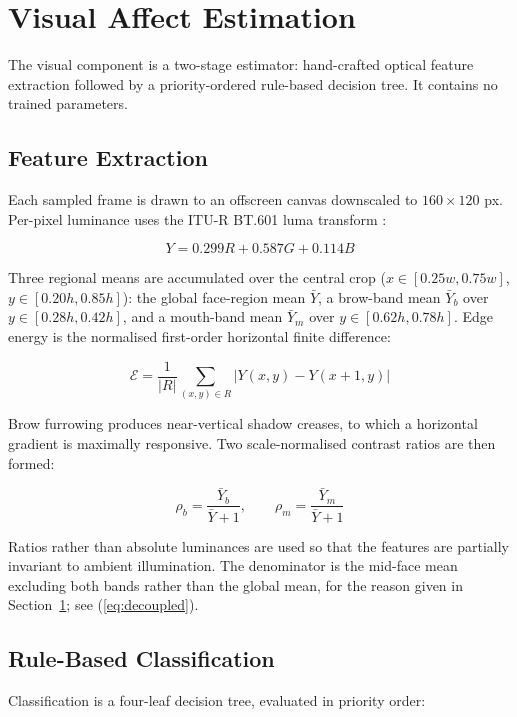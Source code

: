 \documentclass[conference]{IEEEtran}
\begin{document}
\section{Visual Affect Estimation}
\label{sec:vision}

The visual component is a two-stage estimator: hand-crafted optical feature
extraction followed by a priority-ordered rule-based decision tree. It contains
no trained parameters.

\subsection{Feature Extraction}
Each sampled frame is drawn to an offscreen canvas downscaled to
$160 \times 120$ px. Per-pixel luminance uses the ITU-R BT.601 luma transform
\cite{bt601}:

\begin{equation}
Y = 0.299R + 0.587G + 0.114B
\end{equation}

Three regional means are accumulated over the central crop
($x \in [0.25w, 0.75w]$, $y \in [0.20h, 0.85h]$): the global face-region mean
$\bar{Y}$, a brow-band mean $\bar{Y}_b$ over $y \in [0.28h, 0.42h]$, and a
mouth-band mean $\bar{Y}_m$ over $y \in [0.62h, 0.78h]$. Edge energy is the
normalised first-order horizontal finite difference:

\begin{equation}
\mathcal{E} = \frac{1}{|R|}\sum_{(x,y) \in R} \bigl| Y(x,y) - Y(x{+}1,y) \bigr|
\end{equation}

Brow furrowing produces near-vertical shadow creases, to which a horizontal
gradient is maximally responsive. Two scale-normalised contrast ratios are
then formed:

\begin{equation}
\rho_b = \frac{\bar{Y}_b}{\bar{Y} + 1}, \qquad
\rho_m = \frac{\bar{Y}_m}{\bar{Y} + 1}
\end{equation}

Ratios rather than absolute luminances are used so that the features are
partially invariant to ambient illumination. The denominator is the mid-face
mean excluding both bands rather than the global mean, for the reason given in
Section~\ref{sec:vision}; see (\ref{eq:decoupled}).

\subsection{Rule-Based Classification}
Classification is a four-leaf decision tree, evaluated in priority order:
\end{document}
